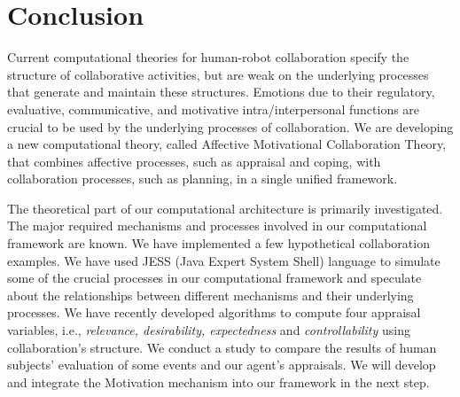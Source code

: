 \documentclass[letterpaper]{article}
\begin{document}
\vspace*{-3mm}
\section{Conclusion}

Current computational theories for human-robot collaboration specify the
structure of collaborative activities, but are weak on the underlying processes
that generate and maintain these structures. Emotions due to their regulatory,
evaluative, communicative, and motivative intra/interpersonal functions are
crucial to be used by the underlying processes of collaboration. We are
developing a new computational theory, called Affective Motivational
Collaboration Theory, that combines affective processes, such as appraisal
and coping, with collaboration processes, such as planning, in a single unified
framework.

The theoretical part of our computational architecture is primarily
investigated. The major required mechanisms and processes involved in our
computational framework are known. We have implemented a few hypothetical
collaboration examples. We have used JESS (Java Expert System Shell) language to
simulate some of the crucial processes in our computational framework and
speculate about the relationships between different mechanisms and their
underlying processes. We have recently developed algorithms to compute four
appraisal variables, i.e., \textit{relevance, desirability, expectedness} and
\textit{controllability} using collaboration's structure. We conduct a study to
compare the results of human subjects' evaluation of some events and our agent's
appraisals. We will develop and integrate the Motivation mechanism
into our framework in the next step.


\vspace*{-3mm}



\end{document}

